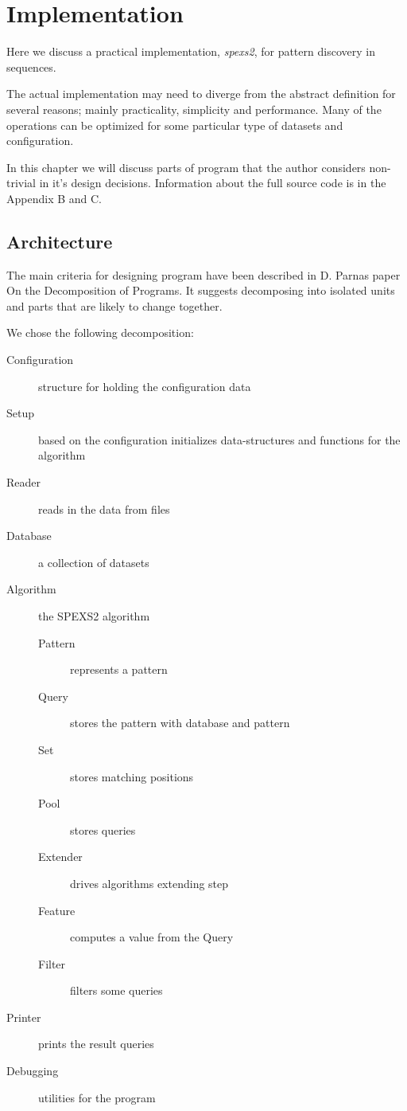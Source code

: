 \chapter{Implementation}

Here we discuss a practical implementation, \emph{spexs2}, for
pattern discovery in sequences.

The actual implementation may need to diverge from the abstract
definition for several reasons; mainly practicality, simplicity and
performance. Many of the operations can be optimized for some 
particular type of datasets and configuration.

In this chapter we will discuss parts of program that the author
considers non-trivial in it's design decisions. Information about 
the full source code is in the Appendix B and C.

\section{Architecture}

The main criteria for designing program have been described in D. Parnas
paper On the Decomposition of Programs. It suggests decomposing into
isolated units and parts that are likely to change together. \cite{Parnas72}

We chose the following decomposition:

\begin{description}
    \item[Configuration] structure for holding the configuration data
    \item[Setup] based on the configuration initializes data-structures and functions for the algorithm
    \item[Reader] reads in the data from files
    \item[Database] a collection of datasets
    \item[Algorithm] the SPEXS2 algorithm
    \begin{description}
        \item[Pattern] represents a pattern
        \item[Query] stores the pattern with database and pattern
        \item[Set] stores matching positions
        \item[Pool] stores queries
        \item[Extender] drives algorithms extending step
        \item[Feature] computes a value from the Query
        \item[Filter] filters some queries
    \end{description}
    \item[Printer] prints the result queries
    \item[Debugging] utilities for the program
\end{description}

